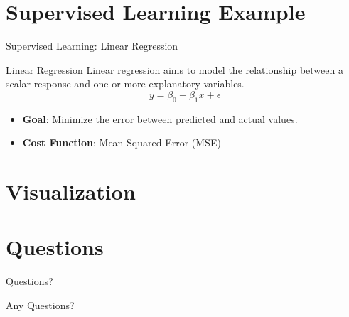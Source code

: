 \section{Supervised Learning Example}
\begin{frame}{Supervised Learning: Linear Regression}
    \begin{block}{Linear Regression}
        Linear regression aims to model the relationship between a scalar response and one or more explanatory variables.
        \[
        y = \beta_0 + \beta_1 x + \epsilon
        \]
    \end{block}
    \begin{itemize}
        \item \textbf{Goal}: Minimize the error between predicted and actual values.
        \item \textbf{Cost Function}: Mean Squared Error (MSE)
    \end{itemize}
\end{frame}

\section{Visualization}

\section{Questions}
\begin{frame}{Questions?}
    \begin{center}
        \Large Any Questions?
    \end{center}
\end{frame}